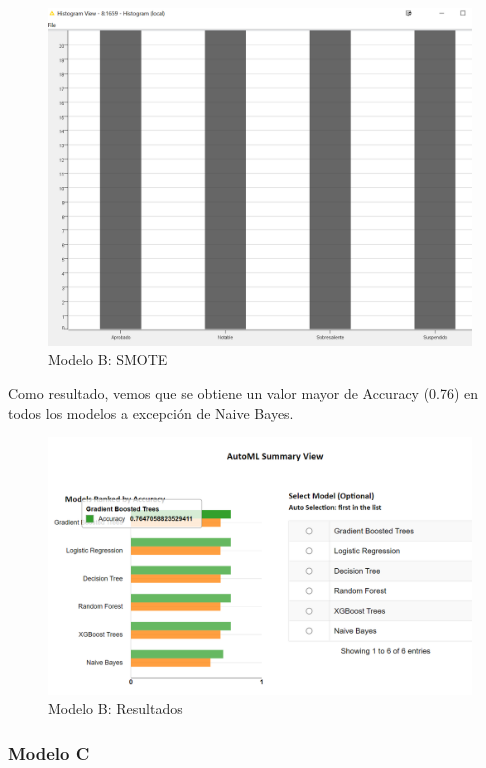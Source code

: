 \begin{figure}[!htb]
	\centering
	\includegraphics[width=1\textwidth]{img/workflowB2.png}
	\caption{Modelo B: SMOTE}
	\label{fig:workflowB2}
\end{figure}
\FloatBarrier

Como resultado, vemos que se obtiene un valor mayor de Accuracy (0.76) en todos los modelos a excepción de Naive Bayes. 

\begin{figure}[!htb]
	\centering
	\includegraphics[width=1\textwidth]{img/workflowB3.png}
	\caption{Modelo B: Resultados}
	\label{fig:workflowB3}
\end{figure}
\FloatBarrier

\subsubsection{Modelo C}

